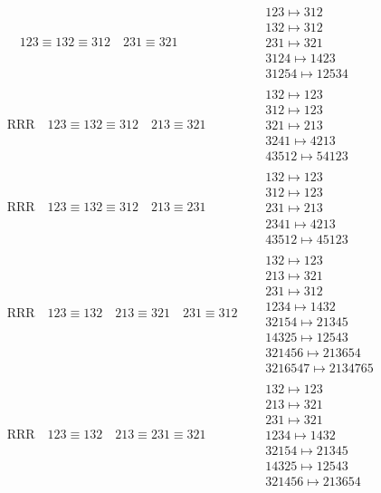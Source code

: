 \documentclass{article}
\begin{document}
\begin{align}
\quad
123\equiv132\equiv312
\quad
231\equiv321
\quad
&
\begin{matrix}
123 \mapsto 312
\\
132 \mapsto 312
\\
231 \mapsto 321
\\
3124 \mapsto 1423
\\
31254 \mapsto 12534
\end{matrix}
\\
\text{RRR}
\quad
123\equiv132\equiv312
\quad
213\equiv321
\quad
&
\begin{matrix}
132 \mapsto 123
\\
312 \mapsto 123
\\
321 \mapsto 213
\\
3241 \mapsto 4213
\\
43512 \mapsto 54123
\end{matrix}
\\
\text{RRR}
\quad
123\equiv132\equiv312
\quad
213\equiv231
\quad
&
\begin{matrix}
132 \mapsto 123
\\
312 \mapsto 123
\\
231 \mapsto 213
\\
2341 \mapsto 4213
\\
43512 \mapsto 45123
\end{matrix}
\\
\text{RRR}
\quad
123\equiv132
\quad
213\equiv321
\quad
231\equiv312
\quad
&
\begin{matrix}
132 \mapsto 123
\\
213 \mapsto 321
\\
231 \mapsto 312
\\
1234 \mapsto 1432
\\
32154 \mapsto 21345
\\
14325 \mapsto 12543
\\
321456 \mapsto 213654
\\
3216547 \mapsto 2134765
\end{matrix}
\\
\text{RRR}
\quad
123\equiv132
\quad
213\equiv231\equiv321
\quad
&
\begin{matrix}
132 \mapsto 123
\\
213 \mapsto 321
\\
231 \mapsto 321
\\
1234 \mapsto 1432
\\
32154 \mapsto 21345
\\
14325 \mapsto 12543
\\
321456 \mapsto 213654

\end{matrix}
\end{align}
\end{document}
